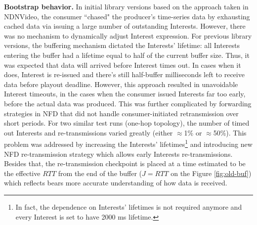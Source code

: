 \documentclass{icn/sig-alternate-2013} %
\begin{document}

%
%

\textbf{Bootstrap behavior.} In initial library versions based on the approach taken in NDNVideo, the consumer ``chased" the producer's time-series data by exhausting cached data via issuing a large number of outstanding Interests. However, there was no mechanism to dynamically adjust Interest expression. %
For previous library versions, the buffering mechanism dictated the Interests' lifetime: all Interests entering the buffer had a lifetime equal to half of the current buffer size. Thus, it was expected that data will arrived before Interest times out. In cases when it does, Interest is re-issued and there's still half-buffer milliseconds left to receive data before playout deadline.
However, this approach resulted in unavoidable Interest timeouts, in the cases when the consumer issued Interests far too early, before the actual data was produced.  This was further complicated by forwarding strategies in NFD that did not handle consumer-initiated retransmission over short periods. 
For two similar test runs (one-hop topology), the number of timed out Interests and re-transmissions varied greatly (either $\approx$1\% or $\approx$50\%). %
This problem was addressed by increasing the Interests' lifetimes\footnote{In fact, the dependence on Interests' lifetimes is not required anymore and every Interest is set to have 2000 ms lifetime.} and introducing new NFD re-transmission strategy which allows early Interests re-transmissions. 
Besides that, the re-transmission checkpoint is placed at a time estimated to be the effective $RTT$ from the end of the buffer ($J=RTT$ on the Figure \ref{fig:old-buf}) which reflects bears more accurate understanding of how data is received.
\end{document}

